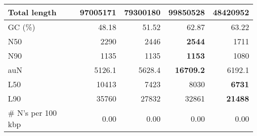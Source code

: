 \documentclass[12pt,a4paper]{article}
\begin{document}
\begin{table}[ht]
\begin{center}
\begin{tabular}{|l*{4}{|r}|}
Total length & 97005171 & 79300180 & {\bf 99850528} & 48420952 \\ \hline
GC (\%) & 48.18 & 51.52 & 62.87 & 63.22 \\ \hline
N50 & 2290 & 2446 & {\bf 2544} & 1711 \\ \hline
N90 & 1135 & 1135 & {\bf 1153} & 1080 \\ \hline
auN & 5126.1 & 5628.4 & {\bf 16709.2} & 6192.1 \\ \hline
L50 & 10413 & 7423 & 8030 & {\bf 6731} \\ \hline
L90 & 35760 & 27832 & 32861 & {\bf 21488} \\ \hline
\# N's per 100 kbp & 0.00 & 0.00 & 0.00 & 0.00 \\ \hline
\end{tabular}
\end{center}
\end{table}
\end{document}
